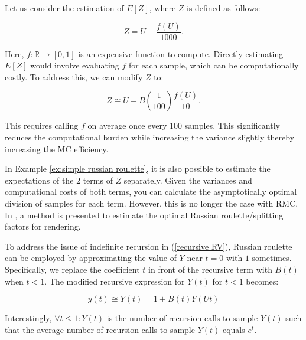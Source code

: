 \documentclass[a4paper,12pt]{article}
\begin{document}
\begin{example} \label{ex:simple russian roulette}
    Let us consider the estimation of $E[Z]$, where $Z$ is defined as follows:

    \begin{equation}
        Z = U + \frac{f(U)}{1000}.
    \end{equation}

    Here, $f:\mathbb{R} \rightarrow [0,1]$ is an expensive function to compute.
    Directly estimating $E[Z]$ would involve evaluating $f$ for each sample,
    which can be computationally costly. To address this, we can modify $Z$ to:

    \begin{equation}
        Z \cong U + B\left(\frac{1}{100}\right)\frac{f(U)}{10}.
    \end{equation}

    This requires calling $f$ on
    average once every $100$ samples. This significantly reduces the
    computational burden while increasing the variance slightly thereby increasing
    the MC efficiency.\\
\end{example}

\begin{related}
    In Example \ref{ex:simple russian roulette}, it is also
    possible to estimate the expectations of the $2$ terms
    of $Z$ separately. Given the variances and computational costs
    of both terms, you can calculate the asymptotically optimal division
    of samples for each term. However, this is no longer the case with RMC.
    In \cite{rath_ears_2022}, a method is presented to estimate the optimal
    Russian roulette/splitting factors for rendering.
\end{related}


\begin{example} \label{ex: russian roulette}
    To address the issue of indefinite recursion in
    (\ref{recursive RV}), Russian roulette can be employed
    by approximating the value of $Y$ near $t = 0$ with $1$
    sometimes. Specifically, we replace the coefficient $t$
    in front of the recursive term with $B(t)$ when $t < 1$.
    The modified recursive expression for $Y(t)$ for $t<1$ becomes:

    \begin{equation}\label{eq:rr example}
        y(t) \cong Y(t) = 1 + B(t)Y(Ut)
    \end{equation}

    Interestingly, $\forall t \le 1:Y(t)$ is the number of recursion calls
    to sample $Y(t)$ such that the average number of recursion
    calls to sample $Y(t)$ equals $e^{t}$.

\end{example}
\end{document}
